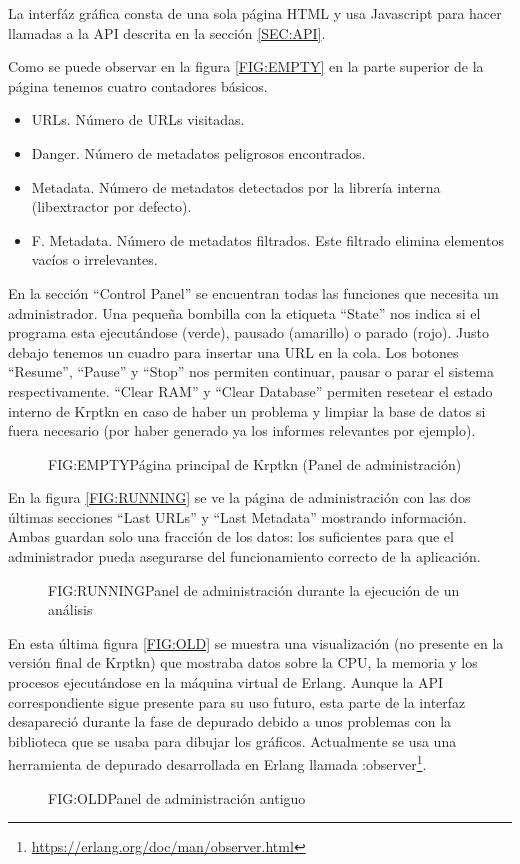 La interfáz gráfica consta de una sola página HTML y usa Javascript para hacer llamadas a la API descrita en la sección \ref{SEC:API}.

Como se puede observar en la figura \ref{FIG:EMPTY} en la parte superior de la página tenemos cuatro contadores básicos.

\begin{itemize}
  \item URLs. Número de URLs visitadas.
  \item Danger. Número de metadatos peligrosos encontrados.
  \item Metadata. Número de metadatos detectados por la librería interna (libextractor por defecto).
  \item F. Metadata. Número de metadatos filtrados. Este filtrado elimina elementos vacíos o irrelevantes.
\end{itemize}

En la sección ``Control Panel'' se encuentran todas las funciones que necesita un administrador. Una pequeña bombilla con la etiqueta ``State'' nos indica si el programa esta ejecutándose (verde), pausado (amarillo) o parado (rojo). Justo debajo tenemos un cuadro para insertar una URL en la cola. Los botones ``Resume'', ``Pause'' y ``Stop'' nos permiten continuar, pausar o parar el sistema respectivamente. ``Clear RAM'' y ``Clear Database'' permiten resetear el estado interno de Krptkn en caso de haber un problema y limpiar la base de datos si fuera necesario (por haber generado ya los informes relevantes por ejemplo).

\begin{figure}[emtpy]{FIG:EMPTY}{Página principal de Krptkn (Panel de administración)}
\end{figure}

En la figura \ref{FIG:RUNNING} se ve la página de administración con las dos últimas secciones ``Last URLs'' y ``Last Metadata'' mostrando información. Ambas guardan solo una fracción de los datos: los suficientes para que el administrador pueda asegurarse del funcionamiento correcto de la aplicación.

\begin{figure}[running]{FIG:RUNNING}{Panel de administración durante la ejecución de un análisis}
\end{figure}

En esta última figura \ref{FIG:OLD} se muestra una visualización (no presente en la versión final de Krptkn) que mostraba datos sobre la CPU, la memoria y los procesos ejecutándose en la máquina virtual de Erlang. Aunque la API correspondiente sigue presente para su uso futuro, esta parte de la interfaz desapareció durante la fase de depurado debido a unos problemas con la biblioteca que se usaba para dibujar los gráficos. Actualmente se usa una herramienta de depurado desarrollada en Erlang llamada :observer\footnote{\url{https://erlang.org/doc/man/observer.html}}.

\begin{figure}[old]{FIG:OLD}{Panel de administración antiguo}
\end{figure}